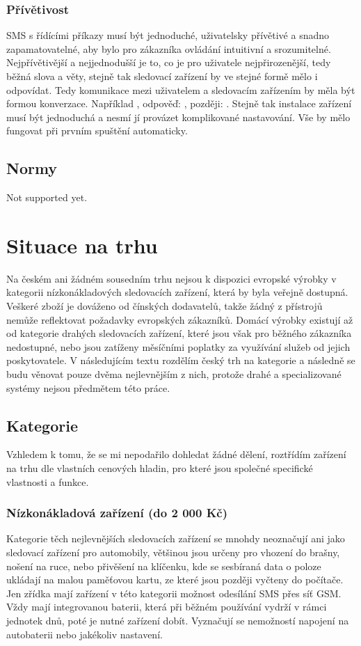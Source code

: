 \documentclass[FM,BP]{tulthesis}  %
\begin{document}
\subsection{Přívětivost}
SMS s řídícími příkazy musí být jednoduché, uživatelsky přívětivé a snadno zapamatovatelné, aby bylo pro zákazníka ovládání intuitivní a srozumitelné. Nejpřívětivější a nejjednodušší je to, co je pro uživatele nejpřirozenější, tedy běžná slova a věty, stejně tak sledovací zařízení by ve stejné formě mělo i odpovídat. Tedy komunikace mezi uživatelem a sledovacím zařízením by měla být formou konverzace. Například , odpověď: , později: . Stejně tak instalace zařízení musí být jednoduchá a nesmí jí provázet komplikované nastavování. Vše by mělo fungovat při prvním spuštění automaticky.

\section{Normy}
Not supported yet.


\chapter{Situace na trhu}
Na českém ani žádném sousedním trhu nejsou k dispozici evropské výrobky v kategorii nízkonákladových sledovacích zařízení, která by byla veřejně dostupná. Veškeré zboží je dováženo od čínských dodavatelů, takže žádný z přístrojů nemůže reflektovat požadavky evropských zákazníků. Domácí výrobky existují až od kategorie drahých sledovacích zařízení, které jsou však pro běžného zákazníka nedostupné, nebo jsou zatíženy měsíčními poplatky za využívání služeb od jejich poskytovatele. V následujícím textu rozdělím český trh na kategorie a následně se budu věnovat pouze dvěma nejlevnějším z nich, protože drahé a specializované systémy nejsou předmětem této práce.

\section{Kategorie}
Vzhledem k tomu, že se mi nepodařilo dohledat žádné dělení, roztřídím zařízení na trhu dle vlastních cenových hladin, pro které jsou společné specifické vlastnosti a funkce.

\subsection{Nízkonákladová zařízení (do 2 000 Kč)}
Kategorie těch nejlevnějších sledovacích zařízení se mnohdy neoznačují ani jako sledovací zařízení pro automobily, většinou jsou určeny pro vhození do brašny, nošení na ruce, nebo přivěšení na klíčenku, kde se sesbíraná data o poloze ukládají na malou paměťovou kartu, ze které jsou později vyčteny do počítače. Jen zřídka mají zařízení v této kategorii možnost odesílání SMS přes síť GSM. Vždy mají integrovanou baterii, která při běžném používání vydrží v rámci jednotek dnů, poté je nutné zařízení dobít. Vyznačují se nemožností napojení na autobaterii nebo jakékoliv nastavení.
\end{document}
